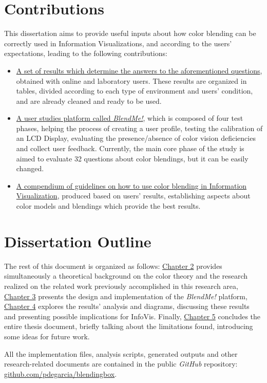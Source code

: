 \section{Contributions}
%
This dissertation aims to provide useful inputs about how color blending can be correctly used in Information Visualizations,
and according to the users' expectations, leading to the following contributions:
%
\begin{itemize}
  \item \ul{A set of results which determine the answers to the aforementioned questions}, obtained with online and laboratory
  users. These results are organized in tables, divided according to each type of environment and users' condition, and are
  already cleaned and ready to be used.
  \item \ul{A user studies platform called \emph{BlendMe!}}, which is composed of four test phases, helping the process of creating
  a user profile, testing the calibration of an LCD Display, evaluating the presence/absence of color vision deficiencies and collect
  user feedback. Currently, the main core phase of the study is aimed to evaluate 32 questions about color blendings, but it can
  be easily changed.
  \item \ul{A compendium of guidelines on how to use color blending in Information Visualization}, produced based on users'
  results, establishing aspects about color models and blendings which provide the best results.
\end{itemize}
%
\section{Dissertation Outline}
%
The rest of this document is organized as follows: \ul{Chapter 2} provides simultaneously a theoretical background on the
color theory and the research realized on the related work previously accomplished in this research area, \ul{Chapter 3}
presents the design and implementation of the \emph{BlendMe!} platform, \ul{Chapter 4} explores the results' analysis and
diagrams, discussing these results and presenting possible implications for InfoVis. Finally, \ul{Chapter 5} concludes the
entire thesis document, briefly talking about the limitations found, introducing some ideas for future work. \par
%
All the implementation files, analysis scripts, generated outputs and other research-related documents are contained in the
public \emph{GitHub} repository: \url{github.com/pdegarcia/blendingbox}.
%
